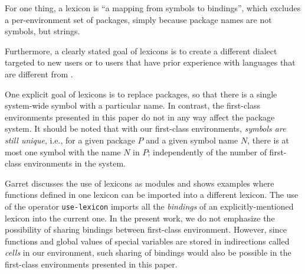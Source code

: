 For one thing, a lexicon is ``a mapping from symbols to bindings'',
which excludes a per-environment set of packages, simply because
package names are not symbols, but strings.

Furthermore, a clearly stated goal of lexicons is to create a
different \lisp{} dialect targeted to new users or to users that have
prior experience with languages that are different from \lisp{}.

One explicit goal of lexicons is to replace \commonlisp{} packages, so
that there is a single system-wide symbol with a particular name.  In
contrast, the first-class environments presented in this paper do not
in any way affect the package system.  It should be noted that with
our first-class environments, \emph{symbols are still unique}, i.e.,
for a given package $P$ and a given symbol name $N$, there is at most
one symbol with the name $N$ in $P$; independently of the number of
first-class environments in the system.

Garret discusses the use of lexicons as modules and shows examples
where functions defined in one lexicon can be imported into a
different lexicon.  The use of the operator \texttt{use-lexicon}
imports all the \emph{bindings} of an explicitly-mentioned lexicon
into the current one.  In the present work, we do not emphasize the
possibility of sharing bindings between first-class environment.
However, since functions and global values of special variables are
stored in indirections called \emph{cells} in our environment, such
sharing of bindings would also be possible in the first-class
environments presented in this paper.
